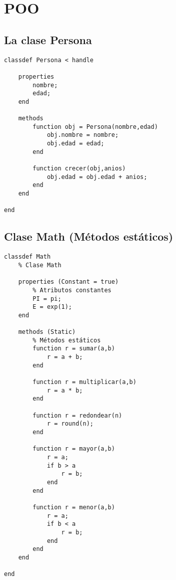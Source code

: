 \chapter{POO}

\section{La clase Persona}


\sol

\begin{verbatim}
classdef Persona < handle
    
    properties
        nombre;
        edad;
    end
    
    methods
        function obj = Persona(nombre,edad)
            obj.nombre = nombre;
            obj.edad = edad;
        end
        
        function crecer(obj,anios)
            obj.edad = obj.edad + anios;
        end
    end
    
end
\end{verbatim}


\section{Clase Math (Métodos estáticos)}


\sol

\begin{verbatim}
classdef Math
    % Clase Math
    
    properties (Constant = true)
        % Atributos constantes
        PI = pi;
        E = exp(1);
    end
    
    methods (Static)
        % Métodos estáticos
        function r = sumar(a,b)
            r = a + b;
        end
        
        function r = multiplicar(a,b)
            r = a * b;
        end
        
        function r = redondear(n)
            r = round(n);
        end
        
        function r = mayor(a,b)
            r = a;
            if b > a
                r = b;
            end
        end
        
        function r = menor(a,b)
            r = a;
            if b < a
                r = b;
            end
        end
    end
    
end  
\end{verbatim}
